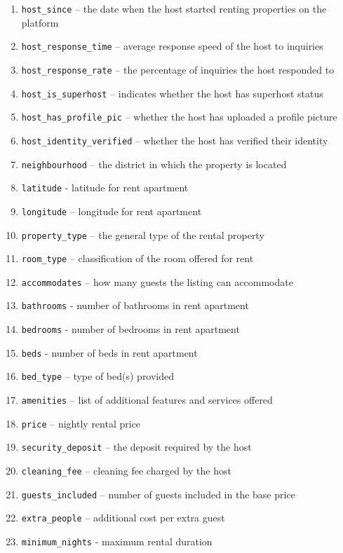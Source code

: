 \begin{enumerate}
    \item \texttt{host\_since} – the date when the host started renting properties on the platform
    \item \texttt{host\_response\_time} – average response speed of the host to inquiries
    \item \texttt{host\_response\_rate} – the percentage of inquiries the host responded to
    \item \texttt{host\_is\_superhost} – indicates whether the host has superhost status
    \item \texttt{host\_has\_profile\_pic} – whether the host has uploaded a profile picture
    \item \texttt{host\_identity\_verified} – whether the host has verified their identity
    \item \texttt{neighbourhood} – the district in which the property is located
    \item \texttt{latitude} - latitude for rent apartment 
    \item \texttt{longitude} – longitude for rent apartment
    \item \texttt{property\_type} – the general type of the rental property
    \item \texttt{room\_type} – classification of the room offered for rent
    \item \texttt{accommodates} – how many guests the listing can accommodate
    \item \texttt{bathrooms} - number of bathrooms in rent apartment
    \item \texttt{bedrooms} - number of bedrooms in rent apartment
    \item \texttt{beds} - number of beds in rent apartment
    \item \texttt{bed\_type} – type of bed(s) provided
    \item \texttt{amenities} – list of additional features and services offered
    \item \texttt{price} – nightly rental price
    \item \texttt{security\_deposit} – the deposit required by the host
    \item \texttt{cleaning\_fee} – cleaning fee charged by the host
    \item \texttt{guests\_included} – number of guests included in the base price
    \item \texttt{extra\_people} – additional cost per extra guest
    \item \texttt{minimum\_nights} - maximum rental duration

\end{enumerate}
